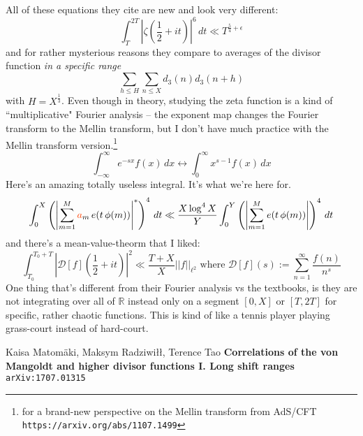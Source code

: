 \documentclass[12pt]{article}
\begin{document}
\noindent All of these equations they cite are new and look very different:
$$ \int_T^{2T} |\zeta(\frac{1}{2} + it) |^6 \, dt \ll T^{\frac{5}{4} + \epsilon} $$
and for rather mysterious reasons they compare to averages of the divisor function \textit{in a specific range}
$$  \sum_{h \leq H} \sum_{n \leq X} d_3(n) d_3(n+h)$$
with $H = X^\frac{1}{3}$.  Even though in theory, studying the zeta function is a kind of ``multiplicative" Fourier analysis -- the exponent map changes the Fourier transform to the Mellin transform, but I don't have much practice with the Mellin transform version.\footnote{for a brand-new perspective on the Mellin transform from AdS/CFT \texttt{https://arxiv.org/abs/1107.1499} }
$$ \int_{-\infty}^\infty e^{-sx} f(x) \, dx \longleftrightarrow \int_0^\infty x^{s-1} f(x) \, dx $$
Here's an amazing totally useless integral.  It's what we're here for.
$$ \int_0^X \left(  \left| \sum_{m=1}^M {\color{red!50!orange}a}_m \, e(t \, \phi(m) )  \right|^* \right)^4  \, dt \ll \frac{X \log^4 X}{Y} \int_0^Y \left( \left| \sum_{m=1}^M e(t \, \phi(m) )  \right| \right)^4 \, dt$$
and there's a mean-value-theorm that I liked:
$$ \int_{T_0}^{T_0 + T} \left|\mathcal{D}[f](\frac{1}{2} + it)  \right|^2 \ll \frac{T+X}{X} ||f||_{\ell^2}  \text{ where } \mathcal{D}[f](s) := \sum_{n=1}^\infty \frac{f(n)}{n^s} $$
One thing that's different from their Fourier analysis vs the textbooks, is they are not integrating over all of $\mathbb{R}$ instead only on a segment $[0,X]$ or $[T, 2T]$ for specific, rather chaotic functions.   This is kind of like a tennis player playing grass-court instead of hard-court.
\vfill



\begin{thebibliography}{}

\item Kaisa Matom\"{a}ki, Maksym Radziwi\l\l, Terence Tao 
\textbf{Correlations of the von Mangoldt and higher divisor functions I. Long shift ranges} \texttt{arXiv:1707.01315}


\end{thebibliography}
\end{document}
